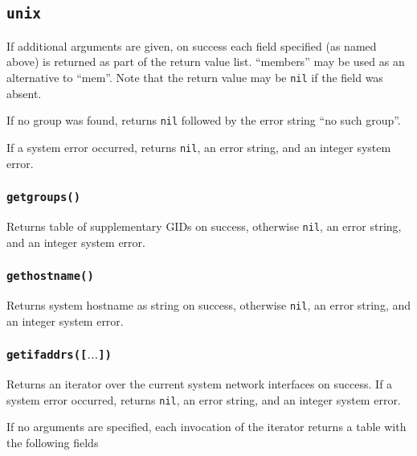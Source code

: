\documentclass[11pt, oneside]{memoir}
\newcommand*{\nil}[0]{\texttt{nil}\xspace}
\newcommand*{\fn}[1]{\texttt{#1}\xspace}
\newcounter{toccols}
\newenvironment{Module}[1]{
	\subsection{\texttt{#1}}
	\addtocontents{toc}{
		\protect\begin{multicols}{\value{toccols}}
	}
}{
	\addtocontents{toc}{\protect\end{multicols}}
}
\begin{document}
\begin{Module}{unix}
If additional arguments are given, on success each field specified (as named above) is returned as part of the return value list. ``members'' may be used as an alternative to ``mem''. Note that the return value may be \nil if the field was absent.

If no group was found, returns \nil followed by the error string ``no such group''.

If a system error occurred, returns \nil, an error string, and an integer system error.

\subsubsection[\fn{getgroups}]{\fn{getgroups()}}

Returns table of supplementary GIDs on success, otherwise \nil, an error string, and an integer system error.

\subsubsection[\fn{gethostname}]{\fn{gethostname()}}

Returns system hostname as string on success, otherwise \nil, an error string, and an integer system error.

\subsubsection[\fn{getifaddrs}]{\fn{getifaddrs([$\ldots$])}}

Returns an iterator over the current system network interfaces on success. If a system error occurred, returns \nil, an error string, and an integer system error.

If no arguments are specified, each invocation of the iterator returns a table with the following fields


\end{Module}
\end{document}
